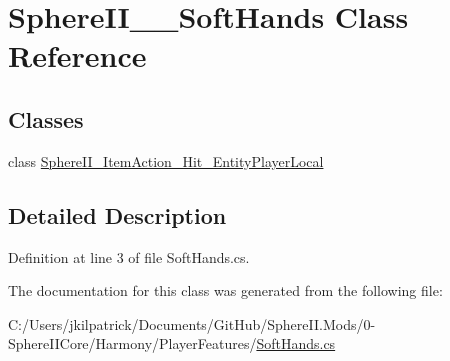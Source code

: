 \hypertarget{class_sphere_i_i_____soft_hands}{}\section{Sphere\+I\+I\+\_\+\+\_\+\+Soft\+Hands Class Reference}
\label{class_sphere_i_i_____soft_hands}
\subsection*{Classes}
\begin{DoxyCompactItemize}
\item 
class \mbox{\hyperlink{class_sphere_i_i_____soft_hands_1_1_sphere_i_i___item_action___hit___entity_player_local}{Sphere\+I\+I\+\_\+\+Item\+Action\+\_\+\+Hit\+\_\+\+Entity\+Player\+Local}}
\end{DoxyCompactItemize}


\subsection{Detailed Description}


Definition at line 3 of file Soft\+Hands.\+cs.



The documentation for this class was generated from the following file\+:\begin{DoxyCompactItemize}
\item 
C\+:/\+Users/jkilpatrick/\+Documents/\+Git\+Hub/\+Sphere\+I\+I.\+Mods/0-\/\+Sphere\+I\+I\+Core/\+Harmony/\+Player\+Features/\mbox{\hyperlink{_soft_hands_8cs}{Soft\+Hands.\+cs}}\end{DoxyCompactItemize}
